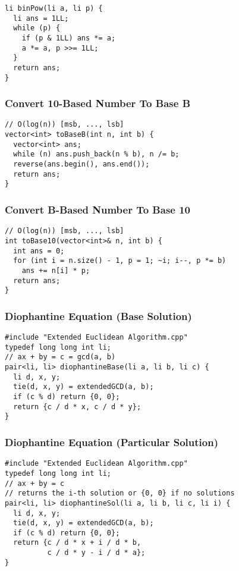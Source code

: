 \documentclass[twoside]{article}
\begin{document}
\begin{multicols*}{2}
\begin{verbatim}
li binPow(li a, li p) {
  li ans = 1LL;
  while (p) {
    if (p & 1LL) ans *= a;
    a *= a, p >>= 1LL;
  }
  return ans;
}
\end{verbatim}

\subsubsectionfont{\large\bfseries\sffamily\underline}
\subsubsection*{Convert 10-Based Number To Base B}
\begin{verbatim}
// O(log(n)) [msb, ..., lsb]
vector<int> toBaseB(int n, int b) {
  vector<int> ans;
  while (n) ans.push_back(n % b), n /= b;
  reverse(ans.begin(), ans.end());
  return ans;
}
\end{verbatim}

\subsubsectionfont{\large\bfseries\sffamily\underline}
\subsubsection*{Convert B-Based Number To Base 10}
\begin{verbatim}
// O(log(n)) [msb, ..., lsb]
int toBase10(vector<int>& n, int b) {
  int ans = 0;
  for (int i = n.size() - 1, p = 1; ~i; i--, p *= b)
    ans += n[i] * p;
  return ans;
}
\end{verbatim}

\subsubsectionfont{\large\bfseries\sffamily\underline}
\subsubsection*{Diophantine Equation (Base Solution)}
\begin{verbatim}
#include "Extended Euclidean Algorithm.cpp"
typedef long long int li;
// ax + by = c = gcd(a, b)
pair<li, li> diophantineBase(li a, li b, li c) {
  li d, x, y;
  tie(d, x, y) = extendedGCD(a, b);
  if (c % d) return {0, 0};
  return {c / d * x, c / d * y};
}
\end{verbatim}

\subsubsectionfont{\large\bfseries\sffamily\underline}
\subsubsection*{Diophantine Equation (Particular Solution)}
\begin{verbatim}
#include "Extended Euclidean Algorithm.cpp"
typedef long long int li;
// ax + by = c
// returns the i-th solution or {0, 0} if no solutions
pair<li, li> diophantineSol(li a, li b, li c, li i) {
  li d, x, y;
  tie(d, x, y) = extendedGCD(a, b);
  if (c % d) return {0, 0};
  return {c / d * x + i / d * b,
          c / d * y - i / d * a};
}
\end{verbatim}


\end{multicols*}
\end{document}
